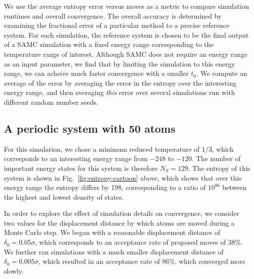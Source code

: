 \documentclass[letterpaper,twocolumn,amsmath,amssymb,pre,aps,10pt]{revtex4-1}
\begin{document}
We use the average entropy error versus moves as a metric to compare
simulation runtimes and overall convergence. The overall accuracy
is determined by examining the fractional error of a particular method to
a precise reference system. For each simulation, the reference system
is chosen to be the final output of a SAMC simulation with a fixed energy range
corresponding to the temperature range of interest.
Although SAMC does not require an energy range as an input parameter,
we find that by limiting the simulation to this energy range, we can
acheive much faster convergence with a smaller $t_0$.  We compute an average
of the error by averaging the error in the entropy over the
interesting energy range, and then averaging \emph{this} error over several
simulations run with different random number seeds.

\subsection{A periodic system with 50 atoms}

For this simulation, we chose a minimum reduced
temperature of $1/3$, which corresponds to an interesting energy range
from $-248$ to $-120$.  The number of important energy states
for this system is therefore $N_S = 129$.  The entropy of this system is shown in
Fig.~\ref{fig:entropy-cartoon} above, which shows that over this
energy range the entropy differs by 198, corresponding to a ratio of
$10^{86}$ between the highest and lowest density of states.

In order to explore the effect of simulation details on convergence,
we consider two values for the displacement distance by which atoms
are moved during a Monte Carlo step.  We began with a reasonable
displacement distance of $\delta_0 = 0.05\sigma$, which corresponds to
an acceptance rate of proposed moves of 38\%.  We further ran
simulations with a much smaller displacement distance of $\delta_0 =
0.005\sigma$, which resulted in an acceptance rate of 86\%, which
converged more slowly.

\end{document}
